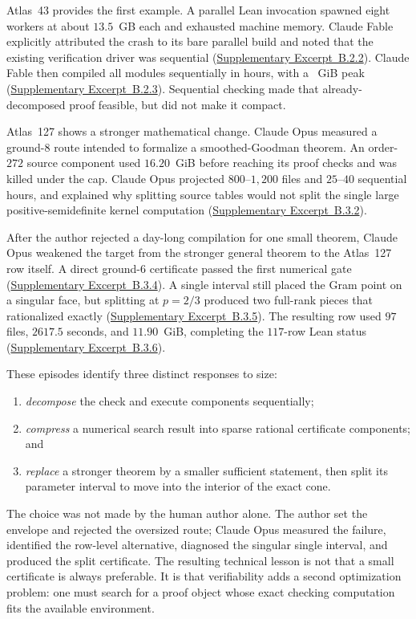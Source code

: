 \documentclass[11pt]{article}
\newcommand{\excerptlink}[2]{\hyperref[ex:#1]{Supplementary Excerpt~#2}}
\begin{document}
Atlas~43 provides the first example.  A parallel Lean invocation spawned
eight workers at about $13.5$~GB each and exhausted machine memory.  Claude
Fable explicitly attributed the crash to its bare parallel build and noted
that the existing verification driver was sequential
(\excerptlink{B22}{B.2.2}).  Claude Fable then compiled all
\AtlasFortyThreeModules{} modules sequentially in \AtlasFortyThreeHours{}
hours, with a \AtlasFortyThreePeakGiB{}~GiB peak
(\excerptlink{B23}{B.2.3}).  Sequential checking made that already-decomposed
proof feasible, but did not make it compact.

Atlas~127 shows a stronger mathematical change.  Claude Opus measured a
ground-$8$ route intended to formalize a smoothed-Goodman theorem.  An
order-$272$ source component used $16.20$~GiB before reaching its proof checks
and was killed under the cap.  Claude Opus projected $800$--$1{,}200$ files
and $25$--$40$ sequential hours, and explained why splitting source tables
would not split the single large positive-semidefinite kernel computation
(\excerptlink{B32}{B.3.2}).

After the author rejected a day-long compilation for one small theorem,
Claude Opus weakened the target from the stronger general theorem to the
Atlas~127 row itself.  A direct ground-$6$ certificate passed the first
numerical gate (\excerptlink{B34}{B.3.4}).  A single interval still placed the
Gram point on a singular face, but splitting at $p=2/3$ produced two
full-rank pieces that rationalized exactly
(\excerptlink{B35}{B.3.5}).  The resulting row used $97$ files, $2617.5$
seconds, and $11.90$~GiB, completing the $117$-row Lean status
(\excerptlink{B36}{B.3.6}).

These episodes identify three distinct responses to size:
\begin{enumerate}[leftmargin=2em]
 \item \emph{decompose} the check and execute components sequentially;
 \item \emph{compress} a numerical search result into sparse rational
 certificate components; and
 \item \emph{replace} a stronger theorem by a smaller sufficient statement,
 then split its parameter interval to move into the interior of the exact
 cone.
\end{enumerate}
The choice was not made by the human author alone.  The author set the
envelope and rejected the oversized route; Claude Opus measured the failure,
identified the row-level alternative, diagnosed the singular single interval,
and produced the split certificate.  The resulting technical lesson is not
that a small certificate is always preferable.  It is that verifiability adds
a second optimization problem: one must search for a proof object whose exact
checking computation fits the available environment.
\end{document}
